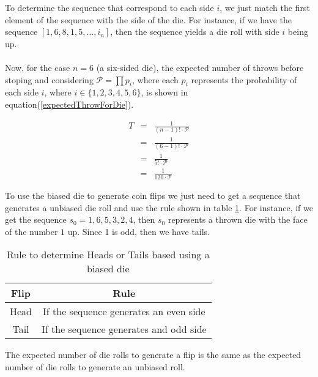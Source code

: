 \documentclass[12pt]{scrartcl}
\begin{document}
\begin{enumerate}
	To determine the sequence that correspond to each side $i$, we just match the first element of the sequence with the side of the die. For instance, if we have the sequence $[1, 6, 8, 1, 5, \ldots, i_n]$, then the sequence yields a die roll with side $i$ being up.	
		\\
		\\
	Now, for the case $n = 6$ (a six-sided die), the expected number of throws before stoping and considering $\mathcal{P} = \prod p_i$, where each $p_i$ represents the probability of each side $i$, where $i \in \{1, 2, 3, 4, 5, 6\}$, is shown in equation(\ref{expectedThrowForDie}).
	
	\begin{eqnarray}\label{expectedThrowForDie}
	T		&	=	&	\frac{1}{(n - 1 )! \cdot \mathcal{P}}  \nonumber \\
			&	=	&	\frac{1}{(6- 1 )! \cdot \mathcal{P}} \nonumber \\
			&	=	&	\frac{1}{5! \cdot \mathcal{P}} \nonumber \\
			&	=	&	\frac{1}{120 \cdot \mathcal{P}}
	\end{eqnarray}
	
	To use the biased die to generate coin flips we just need to get a sequence that generates a unbiased die roll and use the rule shown in table \ref{ruleForFlips}. For instance, if we get the sequence $s_0 = 1, 6, 5, 3, 2, 4$, then $s_0$ represents a thrown die with the face of the number $1$ up. Since 1 is odd, then we have tails.
	
	\begin{table}
	\centering
	\caption{Rule to determine Heads or Tails based using a biased die}
	\label{ruleForFlips}
	\begin{tabular}{|c|c|}
	\hline
		Flip		&	Rule\\
	\hline
		Head	&	If the sequence generates an even side\\
		Tail		&	If the sequence generates and odd side\\
	\hline
	\end{tabular}
	\end{table}
	
	The expected number of die rolls to generate a flip is the same as the expected number of die rolls to generate an unbiased roll.
	

\end{enumerate}
\end{document}
